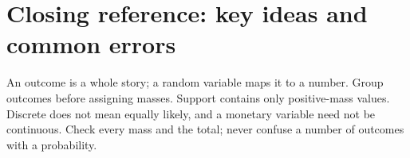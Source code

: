 


\section{Closing reference: key ideas and common errors}\label{sec:t2-c1-closing-reference}


\label{subsec:t2-c1-key-ideas-and-common-errors}
An outcome is a whole story; a random variable maps it to a number. Group outcomes before assigning masses. Support contains only positive-mass values. Discrete does not mean equally likely, and a monetary variable need not be continuous. Check every mass and the total; never confuse a number of outcomes with a probability.



